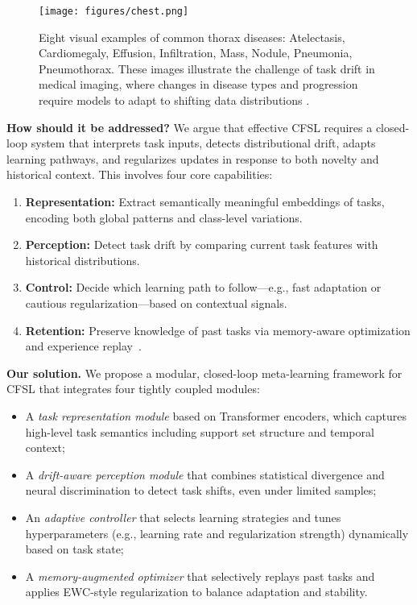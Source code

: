 \documentclass[conference]{IEEEtran}
\begin{document}
\begin{figure*}[t]  %
  \centering
  \texttt{[image: figures/chest.png]}  %
  \caption{Eight visual examples of common thorax diseases: Atelectasis, Cardiomegaly, Effusion, Infiltration, Mass, Nodule, Pneumonia, Pneumothorax. These images illustrate the challenge of task drift in medical imaging, where changes in disease types and progression require models to adapt to shifting data distributions \cite{chestxdet10}.}
  \label{fig:thorax_diseases}
\end{figure*}
\noindent


\vspace{0.5em}
\noindent\textbf{How should it be addressed?}  
We argue that effective CFSL requires a closed-loop system that interprets task inputs, detects distributional drift, adapts learning pathways, and regularizes updates in response to both novelty and historical context. This involves four core capabilities:

\begin{enumerate}
    \item \textbf{Representation:} Extract semantically meaningful embeddings of tasks, encoding both global patterns and class-level variations.
    \item \textbf{Perception:} Detect task drift by comparing current task features with historical distributions.
    \item \textbf{Control:} Decide which learning path to follow—e.g., fast adaptation or cautious regularization—based on contextual signals.
    \item \textbf{Retention:} Preserve knowledge of past tasks via memory-aware optimization and experience replay~\cite{li2025ckpd}.
\end{enumerate}

\vspace{0.5em}
\noindent\textbf{Our solution.}  
We propose a modular, closed-loop meta-learning framework for CFSL that integrates four tightly coupled modules:

\begin{itemize}
    \item A \textit{task representation module} based on Transformer encoders, which captures high-level task semantics including support set structure and temporal context;
    \item A \textit{drift-aware perception module} that combines statistical divergence and neural discrimination to detect task shifts, even under limited samples;
    \item An \textit{adaptive controller} that selects learning strategies and tunes hyperparameters (e.g., learning rate and regularization strength) dynamically based on task state;
    \item A \textit{memory-augmented optimizer} that selectively replays past tasks and applies EWC-style regularization to balance adaptation and stability.
\end{itemize}
\end{document}

